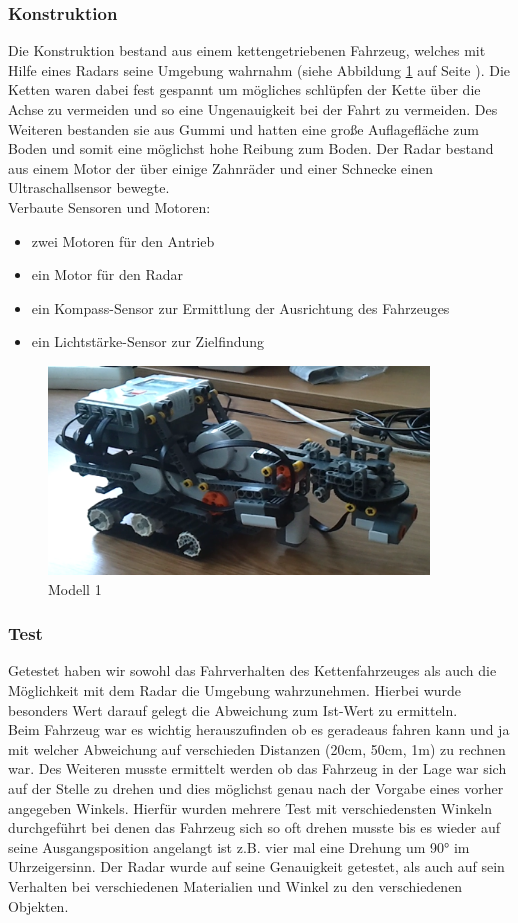 \documentclass[10pt,a4paper]{scrartcl}
\begin{document}
\subsubsection{Konstruktion}
Die Konstruktion bestand aus einem kettengetriebenen Fahrzeug, welches mit Hilfe eines Radars seine Umgebung wahrnahm (siehe Abbildung \ref{modell1} auf Seite \pageref{modell1}). Die Ketten waren dabei fest gespannt um mögliches schlüpfen der Kette über die Achse zu vermeiden und so eine Ungenauigkeit bei der Fahrt zu vermeiden. Des Weiteren bestanden sie aus Gummi und hatten eine große Auflagefläche zum Boden und somit eine möglichst hohe Reibung zum Boden. Der Radar bestand aus einem Motor der über einige Zahnräder und einer Schnecke einen Ultraschallsensor bewegte.\\
Verbaute Sensoren und Motoren:
\begin{itemize}
\item zwei Motoren für den Antrieb
\item ein Motor für den Radar
\item ein Kompass-Sensor zur Ermittlung der Ausrichtung des Fahrzeuges
\item ein Lichtstärke-Sensor zur Zielfindung
\end{itemize}
\begin{figure}[ht]
	\centering
  \includegraphics[width=0.9\textwidth, angle=0]{modell1.png}
	\caption{Modell 1}
	\label{modell1}
\end{figure}
\subsubsection{Test}
Getestet haben wir sowohl das Fahrverhalten des Kettenfahrzeuges als auch die Möglichkeit mit dem Radar die Umgebung wahrzunehmen. Hierbei wurde besonders Wert darauf gelegt die Abweichung zum Ist-Wert zu ermitteln.\\
Beim Fahrzeug war es wichtig herauszufinden ob es geradeaus fahren kann und ja mit welcher Abweichung auf verschieden Distanzen (20cm, 50cm, 1m) zu rechnen war. Des Weiteren musste ermittelt werden ob das Fahrzeug in der Lage war sich auf der Stelle zu drehen und dies möglichst genau nach der Vorgabe eines vorher angegeben Winkels. Hierfür wurden mehrere Test mit verschiedensten Winkeln durchgeführt bei denen das Fahrzeug sich so oft drehen musste bis es wieder auf seine Ausgangsposition angelangt ist z.B. vier mal eine Drehung um 90° im Uhrzeigersinn.
Der Radar wurde auf seine Genauigkeit getestet, als auch auf sein Verhalten bei verschiedenen Materialien und Winkel zu den verschiedenen Objekten.
\end{document}
